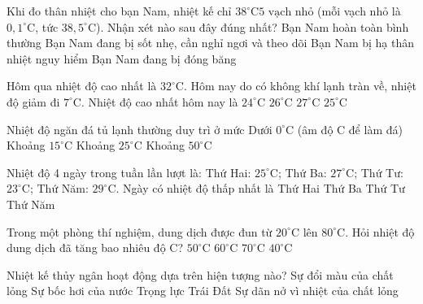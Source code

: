 \begin{ex} %
Khi đo thân nhiệt cho bạn Nam, nhiệt kế chỉ $38^\circ\text{C} 5\text{ vạch nhỏ}$ (mỗi vạch nhỏ là $0,1^\circ\text{C}$, tức $38,5^\circ\text{C}$). Nhận xét nào sau đây đúng nhất?
\choice
{Bạn Nam hoàn toàn bình thường}
{\True Bạn Nam đang bị sốt nhẹ, cần nghỉ ngơi và theo dõi}
{Bạn Nam bị hạ thân nhiệt nguy hiểm}
{Bạn Nam đang bị đóng băng}
\end{ex}

\begin{ex} %
Hôm qua nhiệt độ cao nhất là $32^\circ\text{C}$. Hôm nay do có không khí lạnh tràn về, nhiệt độ giảm đi $7^\circ\text{C}$. Nhiệt độ cao nhất hôm nay là
\choice
{$24^\circ\text{C}$}
{$26^\circ\text{C}$}
{$27^\circ\text{C}$}
{\True $25^\circ\text{C}$}
\end{ex}

\begin{ex} %
Nhiệt độ ngăn đá tủ lạnh thường duy trì ở mức
\choice
{\True Dưới $0^\circ\text{C}$ (âm độ C để làm đá)}
{Khoảng $15^\circ\text{C}$}
{Khoảng $25^\circ\text{C}$}
{Khoảng $50^\circ\text{C}$}
\end{ex}

\begin{ex} %
Nhiệt độ 4 ngày trong tuần lần lượt là: Thứ Hai: $25^\circ\text{C}$; Thứ Ba: $27^\circ\text{C}$; Thứ Tư: $23^\circ\text{C}$; Thứ Năm: $29^\circ\text{C}$. Ngày có nhiệt độ thấp nhất là
\choice
{Thứ Hai}
{Thứ Ba}
{\True Thứ Tư}
{Thứ Năm}
\end{ex}

\begin{ex} %
Trong một phòng thí nghiệm, dung dịch được đun từ $20^\circ\text{C}$ lên $80^\circ\text{C}$. Hỏi nhiệt độ dung dịch đã tăng bao nhiêu độ C?
\choice
{$50^\circ\text{C}$}
{\True $60^\circ\text{C}$}
{$70^\circ\text{C}$}
{$40^\circ\text{C}$}
\end{ex}

\begin{ex} %
Nhiệt kế thủy ngân hoạt động dựa trên hiện tượng nào?
\choice
{Sự đổi màu của chất lỏng}
{Sự bốc hơi của nước}
{Trọng lực Trái Đất}
{\True Sự dãn nở vì nhiệt của chất lỏng}
\end{ex}

